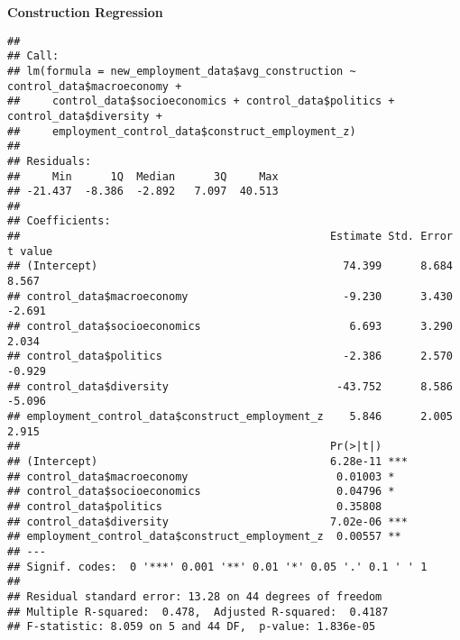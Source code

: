 \documentclass[
]{article}
\newenvironment{Shaded}{\begin{snugshade}}{\end{snugshade}}
\newcommand{\CommentTok}[1]{\textcolor[rgb]{0.56,0.35,0.01}{\textit{#1}}}
\newcommand{\FunctionTok}[1]{\textcolor[rgb]{0.13,0.29,0.53}{\textbf{#1}}}
\newcommand{\NormalTok}[1]{#1}
\newcommand{\OtherTok}[1]{\textcolor[rgb]{0.56,0.35,0.01}{#1}}
\newcommand{\SpecialCharTok}[1]{\textcolor[rgb]{0.81,0.36,0.00}{\textbf{#1}}}
\begin{document}
\textbf{Construction Regression}

\begin{Shaded}
\end{Shaded}

\begin{verbatim}
## 
## Call:
## lm(formula = new_employment_data$avg_construction ~ control_data$macroeconomy + 
##     control_data$socioeconomics + control_data$politics + control_data$diversity + 
##     employment_control_data$construct_employment_z)
## 
## Residuals:
##     Min      1Q  Median      3Q     Max 
## -21.437  -8.386  -2.892   7.097  40.513 
## 
## Coefficients:
##                                                Estimate Std. Error t value
## (Intercept)                                      74.399      8.684   8.567
## control_data$macroeconomy                        -9.230      3.430  -2.691
## control_data$socioeconomics                       6.693      3.290   2.034
## control_data$politics                            -2.386      2.570  -0.929
## control_data$diversity                          -43.752      8.586  -5.096
## employment_control_data$construct_employment_z    5.846      2.005   2.915
##                                                Pr(>|t|)    
## (Intercept)                                    6.28e-11 ***
## control_data$macroeconomy                       0.01003 *  
## control_data$socioeconomics                     0.04796 *  
## control_data$politics                           0.35808    
## control_data$diversity                         7.02e-06 ***
## employment_control_data$construct_employment_z  0.00557 ** 
## ---
## Signif. codes:  0 '***' 0.001 '**' 0.01 '*' 0.05 '.' 0.1 ' ' 1
## 
## Residual standard error: 13.28 on 44 degrees of freedom
## Multiple R-squared:  0.478,  Adjusted R-squared:  0.4187 
## F-statistic: 8.059 on 5 and 44 DF,  p-value: 1.836e-05
\end{verbatim}
\end{document}
